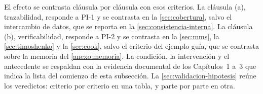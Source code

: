 El efecto se contrasta cláusula por cláusula con esos criterios. La cláusula (a), trazabilidad, responde a PI-1 y se contrasta en la \autoref{sec:cobertura}, salvo el intercambio de datos, que se reporta en la \autoref{sec:consistencia-interna}. La cláusula (b), verificabilidad, responde a PI-2 y se contrasta en la \autoref{sec:mms}, la \autoref{sec:timoshenko} y la \autoref{sec:cook}, salvo el criterio del ejemplo guía, que se contrasta sobre la memoria del \autoref{anexo:memoria}. La condición, la intervención y el antecedente se respaldan con la evidencia documental de los Capítulos~1 a~3 que indica la lista del comienzo de esta subsección. La \autoref{sec:validacion-hipotesis} reúne los veredictos: criterio por criterio en una tabla, y parte por parte en otra.
